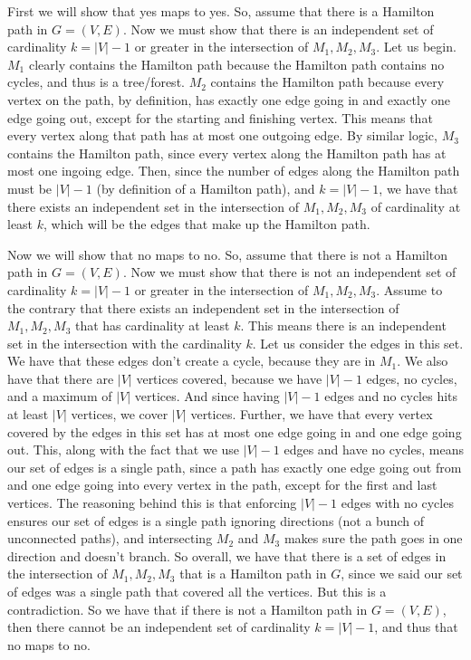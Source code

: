 \documentclass{article}
\begin{document}
First we will show that yes maps to yes. So, assume that there is a Hamilton
path in $G = (V,E)$. Now we must show that there is an independent set of cardinality $k =
|V| - 1$ or greater in the intersection of $M_1,M_2,M_3$. Let us begin. $M_1$ clearly contains the Hamilton
path because the Hamilton path contains no cycles, and thus is a tree/forest.
$M_2$ contains the Hamilton path because every vertex on the path, by
definition, has exactly one edge going in and exactly one edge going out, except
for the starting and finishing vertex. This means that every vertex along that
path has at most one outgoing edge. By similar logic, $M_3$ contains the
Hamilton path, since every vertex along the Hamilton path has at most one
ingoing edge. Then, since the number of edges along the Hamilton path must be
$|V| - 1$ (by definition of a Hamilton path),
and $k = |V| - 1$, we have that there exists an independent set
in the intersection of $M_1,M_2,M_3$ of cardinality at least $k$, which will be
the edges that make up the Hamilton path.

Now we will show that no maps to no. So, assume that there is not a Hamilton
path in $G = (V,E)$. Now we must show that there is not an independent set of
cardinality $k = |V| - 1$ or greater in the intersection of $M_1, M_2, M_3$. Assume to the
contrary that there exists an independent set in the intersection of
$M_1,M_2,M_3$ that has cardinality at least $k$. This means there is an
independent set in the intersection with the cardinality $k$. Let us consider
the edges in this set.  We have that
these edges don't create a cycle, because they are in $M_1$. We also have that
there are $|V|$ vertices covered, because we have $|V| - 1$ edges, no cycles, and a
maximum of $|V|$ vertices. And since having $|V| - 1$ edges and no cycles hits
at least $|V|$ vertices, we cover $|V|$ vertices. Further, we have that every
vertex covered by the edges in this set has at most one edge going in and one edge going out.
This, along with the fact that we use $|V| - 1$ edges and have no cycles,
means our set of edges is a single path, since a path has exactly one edge
going out from and one edge going into every vertex in the path, except for the
first and last vertices. The reasoning behind this is that
enforcing $|V| - 1$ edges with no cycles ensures our set of edges is a single
path ignoring directions (not a bunch of unconnected paths), and intersecting $M_2$
and $M_3$ makes sure the path goes in one direction and doesn't branch. So overall,
we have that there is a set of edges in the intersection of $M_1,M_2,M_3$ that
is a Hamilton path in $G$, since we said our set of edges was a single path that
covered all the vertices. But this is a contradiction. So we have that if there
is not a Hamilton path in $G = (V,E)$, then there cannot be an independent set
of cardinality $k = |V| - 1$, and thus that no maps to no.
\end{document}
